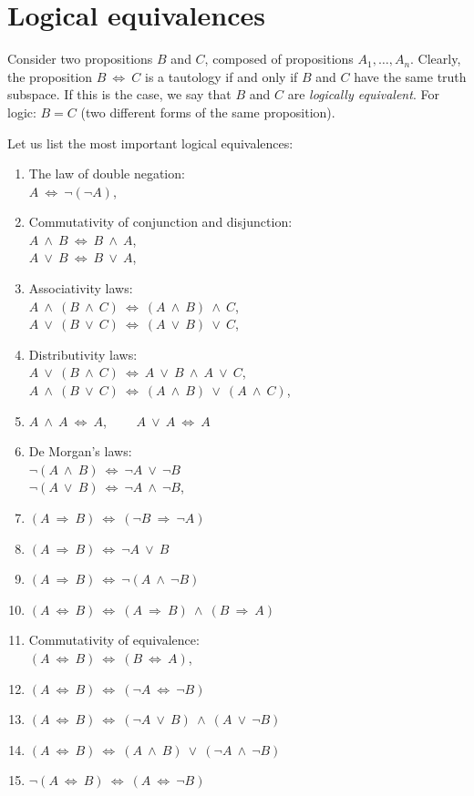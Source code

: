 \documentclass[11pt,paper=b5,footinclude,headinclude]{scrbook} %
\def\ali {{~\vee~}}
\def\inn {{~\wedge~}}
\def\sledi {{~\Rightarrow~}}
\def\cee {{~\Leftrightarrow~}}
\theoremstyle{remark}
\theoremstyle{definition} %
\theoremstyle{theorem} %
\begin{document}
\section{Logical equivalences}

Consider two propositions $B$ and $C$, composed of propositions $A_1,\ldots, A_n$.
Clearly, the proposition $B\cee C$ is a tautology if and only if $B$ and $C$ have the same truth subspace.
If this is the case, we say that $B$ and $C$ are {\em logically equivalent}.
For logic: $B = C$ (two different forms of the same proposition).

Let us list the most important logical equivalences:
\begin{enumerate}
  \item The law of double negation:\\
  $A \cee \neg(\neg A)$, 
  \item Commutativity of conjunction and disjunction:\\
  $A\inn B\cee B \inn A$,\\
  $A\ali B\cee B \ali A$, 
  \item Associativity laws:\\
  $A\inn (B\inn C) \cee (A\inn B)\inn C$,\\
  $A\ali (B\ali C) \cee (A\ali B)\ali C$, 
   \item Distributivity laws:\\
   $A\ali (B\inn C) \cee A\ali B \inn A\ali C$, \\
   $A\inn (B\ali C) \cee (A\inn B) \ali (A\inn C)$, 
   \item $A\inn A\cee A$, ~~~~$A\ali A \cee A$
   \item De Morgan's laws:\\
   $\neg(A\inn B)\cee \neg A \ali \neg B$\\
   $\neg(A\ali B)\cee \neg A \inn \neg B$, 
   \item $(A\sledi B) \cee (\neg B\sledi \neg A)$
   \item $(A\sledi B) \cee \neg A\ali B$
   \item $(A\sledi B) \cee \neg(A\inn \neg B)$
   \item $(A\cee B) \cee (A\sledi B) \inn (B\sledi A)$
  \item Commutativity of equivalence:\\
  $(A \cee B) \cee (B\cee A)$,  
  \item $(A \cee B) \cee (\neg A\cee \neg B)$
  \item $(A \cee B) \cee (\neg A\ali B)\inn (A\ali \neg B)$
  \item $(A \cee B) \cee (A\inn B)\ali (\neg A\inn \neg B)$
  \item $\neg(A \cee B) \cee (A\cee \neg B)$
\end{enumerate}
\end{document}

